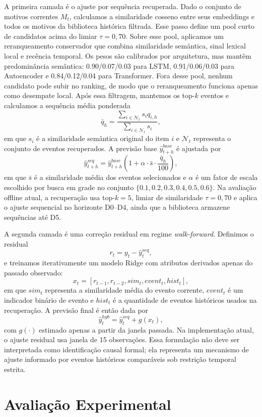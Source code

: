 \documentclass[conference]{IEEEtran}
\begin{document}
A primeira camada é o ajuste por sequência recuperada. Dado o conjunto de motivos correntes $M_t$, calculamos a similaridade cosseno entre seus embeddings e todos os motivos da biblioteca histórica filtrada. Esse passo define um pool curto de candidatos acima do limiar $\tau = 0{,}70$. Sobre esse pool, aplicamos um reranqueamento conservador que combina similaridade semântica, sinal lexical local e recência temporal. Os pesos são calibrados por arquitetura, mas mantêm predominância semântica: 0.90/0.07/0.03 para LSTM, 0.91/0.06/0.03 para Autoencoder e 0.84/0.12/0.04 para Transformer. Fora desse pool, nenhum candidato pode subir no ranking, de modo que o reranqueamento funciona apenas como desempate local. Após essa filtragem, mantemos os top-$k$ eventos e calculamos a sequência média ponderada
\[
\bar{q}_h = \frac{\sum_{i \in \mathcal{N}_t} s_i q_{i,h}}{\sum_{i \in \mathcal{N}_t} s_i},
\]
em que $s_i$ é a similaridade semântica original do item $i$ e $\mathcal{N}_t$ representa o conjunto de eventos recuperados. A previsão base $\hat{y}^{base}_{t+h}$ é ajustada por
\[
\hat{y}^{seq}_{t+h} = \hat{y}^{base}_{t+h}\left(1 + \alpha \cdot \bar{s} \cdot \frac{\bar{q}_h}{100}\right),
\]
em que $\bar{s}$ é a similaridade média dos eventos selecionados e $\alpha$ é um fator de escala escolhido por busca em grade no conjunto $\{0.1, 0.2, 0.3, 0.4, 0.5, 0.6\}$. Na avaliação offline atual, a recuperação usa top-$k=5$, limiar de similaridade $\tau = 0{,}70$ e aplica o ajuste sequencial no horizonte D0--D4, ainda que a biblioteca armazene sequências até D5.

A segunda camada é uma correção residual em regime \textit{walk-forward}. Definimos o residual
\[
r_t = y_t - \hat{y}^{seq}_{t},
\]
e treinamos iterativamente um modelo Ridge com atributos derivados apenas do passado observado:
\[
x_t = [r_{t-1}, r_{t-2}, sim_t, event_t, hist_t],
\]
em que $sim_t$ representa a similaridade média do evento corrente, $event_t$ é um indicador binário de evento e $hist_t$ é a quantidade de eventos históricos usados na recuperação. A previsão final é então dada por
\[
\hat{y}^{hyb}_{t} = \hat{y}^{seq}_{t} + g(x_t),
\]
com $g(\cdot)$ estimado apenas a partir da janela passada. Na implementação atual, o ajuste residual usa janela de 15 observações. Essa formulação não deve ser interpretada como identificação causal formal; ela representa um mecanismo de ajuste informado por eventos históricos comparáveis sob restrição temporal estrita.

\section{Avaliação Experimental}
\end{document}
